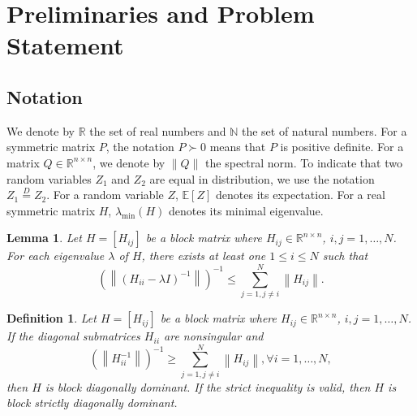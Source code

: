 \documentclass[letterpaper, 10 pt, conference]{ieeeconf}  %
\newtheorem{definition}{Definition}[section]
\newtheorem{lemma}{Lemma}[section]
\begin{document}

\section{Preliminaries and Problem Statement}\label{Sec:preproblme}

\subsection{Notation}
	We denote by $\mathbb{R}$ the set of real numbers and $\mathbb{N}$ the set of natural numbers. For a symmetric matrix $P$, the notation $P \succ 0$ means that $P$ is positive definite. 
For a matrix $Q\in \mathbb{R}^{n\times n}$, we denote by $\left\| Q\right\|$ the spectral norm. 
To indicate that two random variables $Z_1$ and $Z_2$ are equal in distribution, we use the notation $Z_1 \mathop{=}\limits^{D} Z_2$.
For a random variable $Z$, $\mathbb{E}[Z]$ denotes its expectation. For a real symmetric matrix $H$, $\lambda_{\min}(H)$ denotes its minimal eigenvalue. 

\begin{lemma}\cite[Theorem 2]{feingold1962block} \label{Lemma:blockdomi}
     Let $H=[H_{ij}]$ be a block matrix where $H_{ij}\in \mathbb{R}^{n\times n}$, $i,j=1,\ldots, N$. For each eigenvalue $\lambda$ of $H$, there exists at least one $1\leq i\leq N$ such that 
     \begin{equation}
           (\left\| (H_{ii}-\lambda I)^{-1}\right\|)^{-1}\leq \sum_{j=1,j\neq i}^{N}\left\| H_{ij}\right\|. 
     \end{equation}
\end{lemma}



\begin{definition}\label{Def:blockdominant}
    Let $H=[H_{ij}]$ be a block matrix where $H_{ij}\in \mathbb{R}^{n\times n}$, $i,j=1,\ldots, N$.  If  the diagonal submatrices $H_{ii}$ are nonsingular and 
     \begin{equation}
     \left(\left\| H^{-1}_{ii}\right\|\right)^{-1}\geq \sum_{j=1,j\neq i}^{N}\left\| H_{ij}\right\|, \forall i=1,\ldots, N,\end{equation}
    then $H$ is block diagonally dominant. If the strict inequality is valid, then $H$ is block strictly diagonally dominant.
\end{definition}
\end{document}
